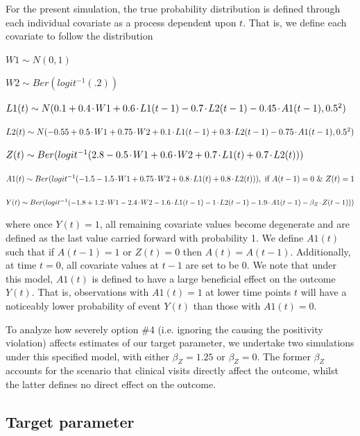 \documentclass{article}\usepackage[]{graphicx}\usepackage[]{color}
\newcommand{\pdot}{\mkern-2mu\cdot\mkern-2mu}
\begin{document}
For the present simulation, the true probability distribution is defined
through each individual covariate as a process dependent upon $t$. That is, we
define each covariate to follow the distribution

\begin{itemize*}
    \item $W1 \sim N(0,1)$
    \item $W2 \sim Ber(logit^{-1}(.2))$
    \item $L1(t) \sim N(0.1 + 0.4\pdot W1 + 0.6\pdot L1(t-1) - 0.7\pdot L2(t-1) - 0.45\pdot A1(t-1), 0.5^{2})$
    \item $L2(t) \sim N(-0.55 + 0.5\pdot W1 + 0.75\pdot W2 + 0.1\pdot L1(t-1) + 0.3\pdot L2(t-1) - 0.75\pdot A1(t-1), 0.5^{2})$
    \item $Z(t) \sim Ber(logit^{-1}(2.8 - 0.5\pdot W1 + 0.6\pdot W2 + 0.7\pdot L1(t) + 0.7\pdot L2(t)))$
    \item $A1(t) \sim Ber(logit^{-1}(-1.5 - 1.5\pdot W1 + 0.75\pdot W2 + 0.8\pdot L1(t) + 0.8\pdot L2(t))), \text{ if } A(t-1)=0 \text{ \& } Z(t)=1$
    \item $Y(t) \sim Ber(logit^{-1}(-1.8 + 1.2\pdot W1 - 2.4\pdot W2 - 1.6\pdot L1(t-1) - 1\pdot L2(t-1) - 1.9\pdot A1(t-1) - \beta_{Z}\pdot Z(t-1)))$
\end{itemize*}

where once $Y(t)=1$, all remaining covariate values become degenerate and are
defined as the last value carried forward with probability 1. We define
$A1(t)$ such that if $A(t-1)=1$ or $Z(t)=0$ then $A(t)=A(t-1)$. Additionally,
at time $t=0$, all covariate values at $t-1$ are set to be $0$. We note that
under this model, $A1(t)$ is defined to have a large beneficial effect on the
outcome $Y(t)$. That is, observations with $A1(t)=1$ at lower time points $t$
will have a noticeably lower probability of event $Y(t)$ than those with $A1(t)=0$. 
\newline 

To analyze how severely option \#4 (i.e. ignoring the causing the positivity
violation) affects estimates of our target parameter, we undertake two
simulations under this specified model, with either $\beta_Z = 1.25$ or $\beta_Z
= 0$. The former $\beta_Z$ accounts for the scenario that clinical visits
directly affect the outcome, whilst the latter defines no direct effect on the
outcome.

\subsection{Target parameter}
\end{document}
